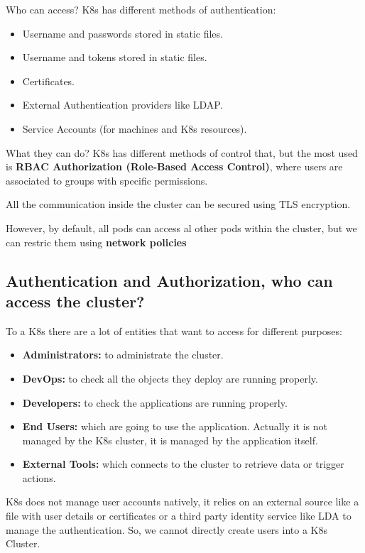 \documentclass{article}
\begin{document}
Who can access? K8s has different methods of authentication:
\begin{itemize}
    \item Username and passwords stored in static files.
    \item Username and tokens stored in static files.
    \item Certificates.
    \item External Authentication providers like LDAP.
    \item Service Accounts (for machines and K8s resources).
\end{itemize}

What they can do? K8s has different methods of control that, but the most used is \textbf{RBAC Authorization (Role-Based Access Control)}, where users are associated to groups with specific permissions.

All the communication inside the cluster can be secured using TLS encryption.

However, by default, all pods can access al other pods within the cluster, but we can restric them using \textbf{network policies}

\subsection{Authentication and Authorization, who can access the cluster?}

To a K8s there are a lot of entities that want to access for different purposes:
\begin{itemize}
    \item \textbf{Administrators:} to administrate the cluster.
    \item \textbf{DevOps:} to check all the objects they deploy are running properly.
    \item \textbf{Developers:} to check the applications are running properly.
    \item \textbf{End Users:} which are going to use the application. Actually it is not managed by the K8s cluster, it is managed by the application itself.
    \item \textbf{External Tools:} which connects to the cluster to retrieve data or trigger actions.
\end{itemize}

K8s does not manage user accounts natively, it relies on an external source like a file with user details or certificates or a third party identity service like LDA to manage the authentication. So, we cannot directly create users into a K8s Cluster.
\end{document}

